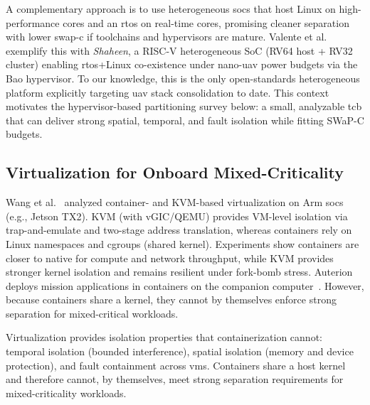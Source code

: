 A complementary approach is to use heterogeneous \glspl{soc} that host Linux on
high-performance cores and an \gls{rtos} on real-time cores, promising cleaner
separation with lower \gls{swap-c} if toolchains and hypervisors are
mature. Valente et al.~\cite{valente_heterogeneous_2024} exemplify this with
\emph{Shaheen}, a RISC-V heterogeneous SoC (RV64 host + RV32 cluster) enabling
\gls{rtos}+Linux co-existence under nano-\gls{uav} power budgets via the Bao hypervisor. %
To our knowledge, this is the only open-standards heterogeneous platform explicitly
targeting \gls{uav} stack consolidation to date.
%
This context motivates the hypervisor-based partitioning survey below: a small,
analyzable \gls{tcb} that can deliver strong spatial, temporal, and fault
isolation while fitting SWaP-C budgets.

\subsection{Virtualization for Onboard Mixed-Criticality}
\label{subsec:rw-virt}
Wang et al.~\cite{wang_enabling_2018} analyzed container- and KVM-based
virtualization on Arm \glspl{soc} (e.g., Jetson TX2). KVM (with vGIC/QEMU) provides VM-level isolation via
trap-and-emulate and two-stage address translation, whereas containers rely on
Linux namespaces and cgroups (shared kernel).
Experiments show containers are closer to native for compute and
network throughput, while KVM provides stronger kernel isolation and remains
resilient under fork-bomb stress. %
Auterion deploys mission applications in containers on the companion computer~\cite{auterion-sw-services}.
However, because containers share a kernel, they cannot by themselves enforce strong separation for mixed-critical workloads.

Virtualization provides isolation properties that containerization cannot:
temporal isolation (bounded interference), spatial isolation (memory and device
protection), and fault containment across \glspl{vm}. Containers share a host
kernel and therefore cannot, by themselves, meet strong separation requirements
for mixed-criticality workloads.

